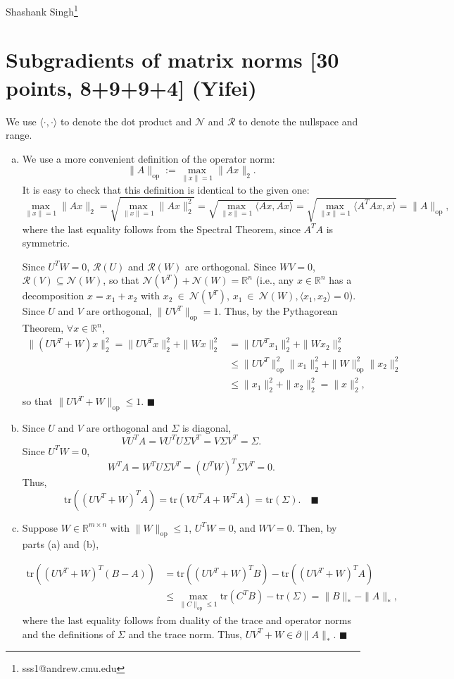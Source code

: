\documentclass[11pt]{article}
\newcommand{\qed}{\quad \ensuremath{\blacksquare}}
\newcommand{\R}{\mathbb{R}}
\newcommand{\op}{{\operatorname{op}}}
\newcommand{\tr}{\mathrm{tr}}
\newcommand{\Ran}{\mathcal{R}} %
\newcommand{\Nul}{\mathcal{N}} %
\begin{document}
Shashank Singh\footnote{sss1@andrew.cmu.edu}
\setcounter{section}{1}
\section{Subgradients of matrix norms [30 points, 8+9+9+4] (Yifei)}
We use $\langle \cdot, \cdot \rangle$ to denote the dot product and $\Nul$ and
$\Ran$ to denote the nullspace and range.
\begin{enumerate}[(a)]
\item We use a more convenient definition of the operator norm:
\[\|A\|_\op := \max_{\|x\| = 1} \|Ax\|_2.\]
It is easy to check that this definition is identical to the given one:
\[
\max_{\|x\| = 1} \|Ax\|_2
 = \sqrt{\max_{\|x\| = 1} \|Ax\|_2^2}
 = \sqrt{\max_{\|x\| = 1} \langle Ax, Ax \rangle}
 = \sqrt{\max_{\|x\| = 1} \langle A^TAx, x \rangle}
 = \|A\|_\op,\]
where the last equality follows from the Spectral Theorem, since $A^TA$ is
symmetric.

Since $U^TW = 0$, $\Ran(U)$ and $\Ran(W)$ are orthogonal. Since $WV = 0$,
$\Ran(V) \subseteq \Nul(W)$, so that $\Nul(V^T) + \Nul(W) = \R^n$ (i.e.,
any $x \in \R^n$ has a decomposition $x = x_1 + x_2$ with $x_2~\in~\Nul(V^T)$,
$x_1~\in~\Nul(W), \langle x_1, x_2 \rangle = 0$).
Since $U$ and $V$ are orthogonal, $\|UV^T\|_\op = 1$.
Thus, by the
Pythagorean Theorem,
$\forall x \in \R^n$,
\begin{align*}
\|(UV^T + W)x\|_2^2
   =    \|UV^Tx\|_2^2 + \|Wx\|_2^2
 & =    \|UV^Tx_1\|_2^2 + \|Wx_2\|_2^2                          \\
 & \leq \|UV^T\|_\op^2\|x_1\|_2^2 + \|W\|_\op^2\|x_2\|_2^2      \\
 & \leq \|x_1\|_2^2 + \|x_2\|_2^2
   =    \|x\|_2^2,
\end{align*}
so that $\|UV^T + W\|_\op \leq 1$. \qed

\item Since $U$ and $V$ are orthogonal and $\Sigma$ is diagonal,
\[VU^TA
    = VU^TU\Sigma V^T
    = V\Sigma V^T
    = \Sigma.
\]
Since $U^TW = 0$,
\[W^TA
    = W^TU\Sigma V^T
    = (U^TW)^T\Sigma V^T
    = 0.
\]
Thus,
\[\tr( (UV^T + W)^T A)
    = \tr(VU^TA + W^TA)
    = \tr(\Sigma). \qed\]

\item Suppose $W \in \R^{m \times n}$ with $\|W\|_\op \leq 1$, $U^TW = 0$, and
$WV = 0$. Then, by parts (a) and (b),

\begin{align*}
\tr( (UV^T + W)^T (B - A) )
 &  = \tr( (UV^T + W)^T B ) - \tr( (UV^T + W)^T A )         \\
 &  \leq \max_{\|C\|_\op \leq 1} \tr(C^TB) - \tr(\Sigma)
    = \|B\|_* - \|A\|_*,
\end{align*}
where the last equality follows from duality of the trace and operator norms
and the definitions of $\Sigma$ and the trace norm. Thus,
$UV^T + W \in \partial\|A\|_*$. \qed


\end{enumerate}
\end{document}
